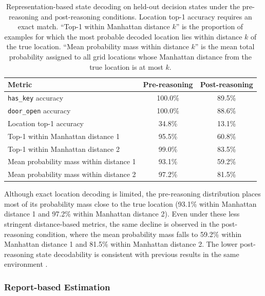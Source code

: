 \documentclass{article}
\begin{document}
\begin{table}[htbp]
\centering
\small
\begin{tabular}{lcc}
\toprule
\textbf{Metric} & \textbf{Pre-reasoning} & \textbf{Post-reasoning} \\
\midrule
\texttt{has\_key} accuracy & 100.0\% & 89.5\% \\
\texttt{door\_open} accuracy & 100.0\% & 88.6\% \\
Location top-1 accuracy & 34.8\% & 13.1\% \\
Top-1 within Manhattan distance 1 & 95.5\% & 60.8\% \\
Top-1 within Manhattan distance 2 & 99.0\% & 83.5\% \\
Mean probability mass within distance 1 & 93.1\% & 59.2\% \\
Mean probability mass within distance 2 & 97.2\% & 81.5\% \\
\bottomrule
\end{tabular}
\caption{Representation-based state decoding on held-out decision states under the pre-reasoning and post-reasoning conditions. Location top-1 accuracy requires an exact match. ``Top-1 within Manhattan distance $k$'' is the proportion of examples for which the most probable decoded location lies within distance $k$ of the true location. ``Mean probability mass within distance $k$'' is the mean total probability assigned to all grid locations whose Manhattan distance from the true location is at most $k$.}
\label{tab:rep-beliefs}
\end{table}

Although exact location decoding is limited, the pre-reasoning distribution places most of its probability mass close to the true location (93.1\% within Manhattan distance 1 and 97.2\% within Manhattan distance 2).
Even under these less stringent distance-based metrics, the same decline is observed in the post-reasoning condition, where the mean probability mass falls to 59.2\% within Manhattan distance 1 and 81.5\% within Manhattan distance 2.
The lower post-reasoning state decodability is consistent with previous results in the same environment \citep{arghal2026behavioural}.

\subsubsection{Report-based Estimation}
\end{document}
